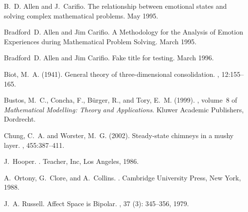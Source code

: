 ﻿\documentclass{article}
\begin{document}
\begin{thebibliography}{}

B.~D. Allen and J.~Carifio.
\newblock The relationship between emotional states and solving complex
  mathematical problems.
\newblock May 1995{}.

Bradford~D. Allen and Jim Carifio.
\newblock A {M}ethodology for the {A}nalysis of {E}motion {E}xperiences during
  {M}athematical {P}roblem {S}olving.
\newblock March 1995{}.

Bradford~D. Allen and Jim Carifio.
\newblock Fake title for testing.
\newblock March 1996.

Biot, M.~A. (1941).
\newblock General theory of three-dimensional consolidation.
, 12:155--165.

Bustos, M.~C., Concha, F., B\"{u}rger, R., and Tory, E.~M. (1999).
, volume~8 of {\em Mathematical Modelling: Theory and
  Applications}.
\newblock Kluwer Academic Publishers, Dordrecht.

Chung, C.~A. and Worster, M.~G. (2002).
\newblock Steady-state chimneys in a mushy layer.
, 455:387--411.

J.~Hooper.
.
\newblock Teacher, Inc, Los Angeles, 1986.

A.~Ortony, G.~Clore, and A.~Collins.
.
\newblock Cambridge University Press, New York, 1988.

J.~A. Russell.
\newblock Affect {S}pace is {B}ipolar.
, 37
  (3): 345--356, 1979.
\end{thebibliography}
\end{document}
